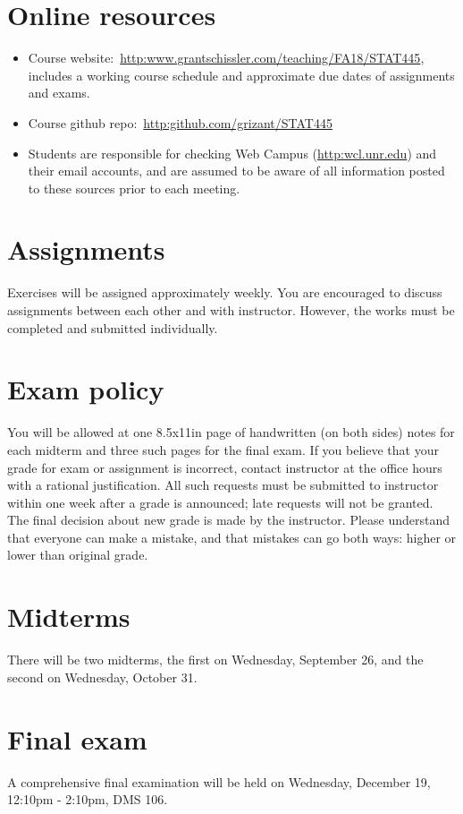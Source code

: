 \documentclass[11pt,onecolumn]{article}
\begin{document}
\section*{Online resources}
\begin{itemize}
\item Course website:~\url{http:www.grantschissler.com/teaching/FA18/STAT445}, includes a working course schedule and approximate due dates of assignments and exams.
\item Course github repo:~\url{http:github.com/grizant/STAT445}
\item Students are responsible for checking Web Campus (\url{http:wcl.unr.edu}) and their email accounts, and are assumed to be aware of all information posted to these sources prior to each meeting.
\end{itemize}

\section*{Assignments}
Exercises will be assigned approximately weekly. You are encouraged to discuss assignments between each other and with instructor. However, the works must be completed and submitted individually.

\section*{Exam policy} You will be allowed at one 8.5x11in page of handwritten (on both sides) notes for each midterm and three such pages for the final exam. If you believe that your grade for exam or assignment is incorrect, contact instructor at the office hours with a rational justification. All such requests must be submitted to instructor within one week after a grade is announced; late requests will not be granted. The final decision about new grade is made by the instructor. Please understand that everyone can make a mistake, and that mistakes can go both ways: higher or lower than original grade.

\section*{Midterms}
There will be two midterms, the first on Wednesday, September 26, and the second on Wednesday, October 31.

\section*{Final exam}
A comprehensive final examination will be held on Wednesday, December 19, 12:10pm - 2:10pm, DMS 106.
\end{document}
